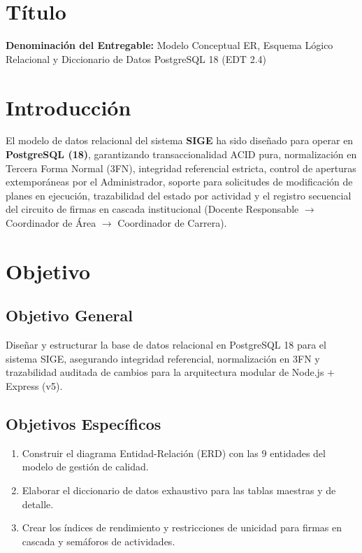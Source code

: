 \documentclass[12pt,a4paper]{article}
\begin{document}
\section{Título}
\textbf{Denominación del Entregable:} Modelo Conceptual ER, Esquema Lógico Relacional y Diccionario de Datos PostgreSQL 18 (EDT 2.4)



\section{Introducción}
El modelo de datos relacional del sistema \textbf{SIGE} ha sido diseñado para operar en \textbf{PostgreSQL (18)}, garantizando transaccionalidad ACID pura, normalización en Tercera Forma Normal (3FN), integridad referencial estricta, control de aperturas extemporáneas por el Administrador, soporte para solicitudes de modificación de planes en ejecución, trazabilidad del estado por actividad y el registro secuencial del circuito de firmas en cascada institucional (Docente Responsable $\rightarrow$ Coordinador de Área $\rightarrow$ Coordinador de Carrera).

\section{Objetivo}

\subsection{Objetivo General}
Diseñar y estructurar la base de datos relacional en PostgreSQL 18 para el sistema SIGE, asegurando integridad referencial, normalización en 3FN y trazabilidad auditada de cambios para la arquitectura modular de Node.js + Express (v5).

\subsection{Objetivos Específicos}
\begin{enumerate}[leftmargin=1.5em, itemsep=2pt, topsep=2pt]
    \item Construir el diagrama Entidad-Relación (ERD) con las 9 entidades del modelo de gestión de calidad.
    \item Elaborar el diccionario de datos exhaustivo para las tablas maestras y de detalle.
    \item Crear los índices de rendimiento y restricciones de unicidad para firmas en cascada y semáforos de actividades.
\end{enumerate}
\end{document}
